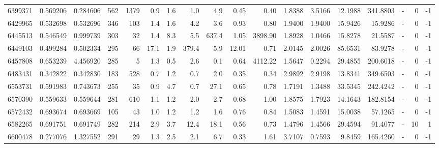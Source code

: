 \begin{tabular}{rrrrrrrrrrrrrrrlrr}
   6399371 & 0.569206 &   0.284606 &  562 & 1379 &      0.9 &      1.6 &     1.0 &      4.9 &       0.45 &        0.40 &  1.8388 &  3.5166 &   12.1988 &  341.8803 &             - &        0 &         -1 \\
   6429965 & 0.532698 &   0.532696 &  346 &  103 &      1.4 &      1.6 &     4.2 &      3.6 &       0.93 &        0.80 &  1.9400 &  1.9400 &   15.9426 &   15.9286 &             - &        0 &         -1 \\
   6445513 & 0.546549 &   0.999739 &  303 &   32 &      1.4 &      8.3 &     5.5 &    637.4 &       1.05 &     3898.90 &  1.8928 &  1.0466 &   15.8278 &   21.5587 &             - &        0 &         -1 \\
   6449103 & 0.499284 &   0.502334 &  295 &   66 &     17.1 &      1.9 &   379.4 &      5.9 &      12.01 &        0.71 &  2.0145 &  2.0026 &   85.6531 &   83.9278 &             - &        0 &         -1 \\
   6457808 & 0.653239 &   4.456920 &  285 &    5 &      1.3 &      0.5 &     2.6 &      0.1 &       0.64 &     4112.22 &  1.5647 &  0.2294 &   29.4855 &  200.6018 &             - &        0 &         -1 \\
   6483431 & 0.342822 &   0.342830 &  183 &  528 &      0.7 &      1.2 &     0.7 &      2.0 &       0.35 &        0.34 &  2.9892 &  2.9198 &   13.8341 &  349.6503 &             - &        0 &         -1 \\
   6553731 & 0.591983 &   0.743673 &  255 &   35 &      0.9 &      4.7 &     0.7 &     27.1 &       0.65 &        0.78 &  1.7191 &  1.3488 &   33.5345 &  242.4242 &             - &        0 &         -1 \\
   6570390 & 0.559633 &   0.559644 &  281 &  610 &      1.1 &      1.2 &     2.0 &      2.7 &       0.68 &        1.00 &  1.8575 &  1.7923 &   14.1643 &  182.8154 &             - &        0 &         -1 \\
   6572432 & 0.693674 &   0.693669 &  105 &   43 &      1.0 &      1.2 &     1.2 &      1.6 &       0.76 &        0.84 &  1.5083 &  1.4591 &   15.0038 &   57.1265 &             - &        0 &         -1 \\
   6582265 & 0.691751 &   0.691749 &  282 &  214 &      2.9 &      3.7 &    12.4 &     18.1 &       0.56 &        0.73 &  1.4796 &  1.4566 &   29.4594 &   91.4077 &             - &       10 &          1 \\
   6600478 & 0.277076 &   1.327552 &  291 &   29 &      1.3 &      2.5 &     2.1 &      6.7 &       0.33 &        1.61 &  3.7107 &  0.7593 &    9.8459 &  165.4260 &             - &        0 &         -1 \\

\end{tabular}
